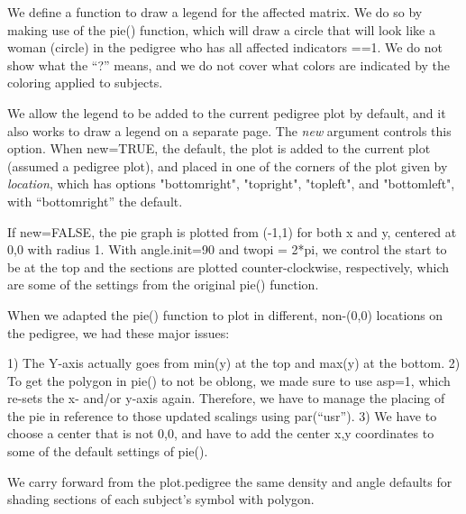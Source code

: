 \documentclass{article}
\begin{document}
We define a function to draw a legend for the affected matrix. We do so
by making use of the pie() function, which will draw a circle that will look
like a woman (circle) in the pedigree who has all affected indicators ==1.  
We do not show what the ``?'' means, and we do not cover what colors are 
indicated by the coloring applied to subjects.

We allow the legend to be added to the current pedigree plot by default,
and it also works to draw a legend on a separate page.  The {\em new} argument
controls this option. When new=TRUE, the default, the plot is added to the 
current plot (assumed a pedigree plot), and placed in one of the corners
of the plot given by {\em location}, which has options "bottomright", 
"topright", "topleft", and "bottomleft", with ``bottomright'' the default.

If new=FALSE, the pie graph is plotted from (-1,1) for both x and y, centered 
at 0,0 with radius 1. With angle.init=90 and twopi = 2*pi, we control the 
start to be at the top and the sections are plotted counter-clockwise, respectively, which are some of the settings from the original pie() function.  

When we adapted the pie() function to plot in different, non-(0,0) locations
on the pedigree, we had these major issues:

1) The Y-axis actually goes from min(y) at the top and max(y) at the bottom.
2) To get the polygon in pie() to not be oblong, we made sure to use asp=1, 
which re-sets the x- and/or y-axis again.  Therefore, we have to manage the 
placing of the pie in reference to those updated scalings using par(``usr'').
3) We have to choose a center that is not 0,0, and have to add the center
x,y coordinates to some of the default settings of pie().

We carry forward from the plot.pedigree the same density and angle defaults
for shading sections of each subject's symbol with polygon.  
\end{document}
